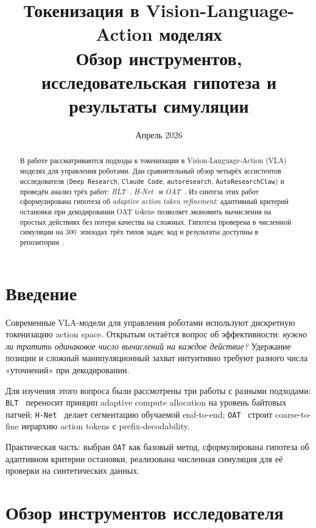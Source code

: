 \documentclass[12pt,a4paper]{article}
\title{%
    \textbf{Токенизация в Vision-Language-Action моделях}\\[0.4em]
    \large Обзор инструментов, исследовательская гипотеза и результаты симуляции
}
\author{}
\date{Апрель 2026}
\begin{document}
\maketitle
\thispagestyle{empty}

\begin{abstract}
В работе рассматриваются подходы к токенизации в Vision-Language-Action (VLA)
моделях для управления роботами. Дан сравнительный обзор четырёх ассистентов
исследователя (\texttt{Deep Research}, \texttt{Claude Code},
\texttt{autoresearch}, \texttt{AutoResearchClaw}) и проведён анализ трёх работ:
\textit{BLT}~\cite{blt}, \textit{H-Net}~\cite{hnet} и \textit{OAT}~\cite{oat}.
Из синтеза этих работ сформулирована гипотеза об \textit{adaptive action token
refinement}: адаптивный критерий остановки при декодировании OAT tokens позволяет
экономить вычисления на простых действиях без потери качества на сложных.
Гипотеза проверена в численной симуляции на 300~эпизодах трёх типов задач;
код и результаты доступны в репозитории~\cite{repo}.
\end{abstract}

\tableofcontents
\newpage

\section{Введение}

Современные VLA-модели для управления роботами используют дискретную
токенизацию action space. Открытым остаётся вопрос об эффективности:
\textit{нужно ли тратить одинаковое число вычислений на каждое действие?}
Удержание позиции и сложный манипуляционный захват интуитивно требуют
разного числа «уточнений» при декодировании.

Для изучения этого вопроса были рассмотрены три работы с разными подходами:
\texttt{BLT}~\cite{blt} переносит принцип adaptive compute allocation
на уровень байтовых патчей; \texttt{H-Net}~\cite{hnet} делает сегментацию
обучаемой end-to-end; \texttt{OAT}~\cite{oat} строит coarse-to-fine иерархию
action tokens с prefix-decodability.

Практическая часть: выбран \texttt{OAT} как базовый метод, сформулирована
гипотеза об адаптивном критерии остановки, реализована численная симуляция
для её проверки на синтетических данных.

\section{Обзор инструментов исследователя}
\end{document}
